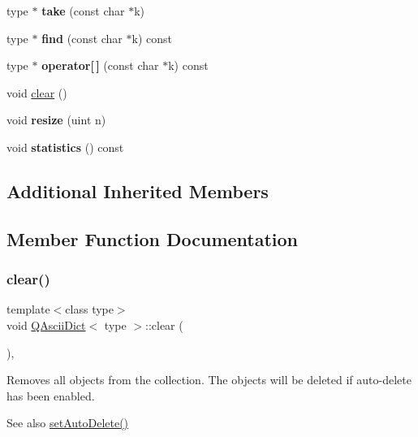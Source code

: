 \begin{DoxyCompactItemize}
type $\ast$ {\bfseries take} (const char $\ast$k)
\item 
\mbox{\label{class_q_ascii_dict_ab37ced8dc0e034d6a6797a054d433cb5}} 
type $\ast$ {\bfseries find} (const char $\ast$k) const
\item 
\mbox{\label{class_q_ascii_dict_a1fac101acb5ecb55be15d81f0b90ec6f}} 
type $\ast$ {\bfseries operator\mbox{[}$\,$\mbox{]}} (const char $\ast$k) const
\item 
void \mbox{\hyperlink{class_q_ascii_dict_a544cec757a84773073971b0a9d3e5e55}{clear}} ()
\item 
\mbox{\label{class_q_ascii_dict_aa783796d001af64fecedf110d8116d60}} 
void {\bfseries resize} (uint n)
\item 
\mbox{\label{class_q_ascii_dict_a2eb5f15ad2ff083ab7509887037d0675}} 
void {\bfseries statistics} () const
\end{DoxyCompactItemize}
\subsection*{Additional Inherited Members}


\subsection{Member Function Documentation}
\mbox{\label{class_q_ascii_dict_a544cec757a84773073971b0a9d3e5e55}} 
\subsubsection{\texorpdfstring{clear()}{clear()}}
{\footnotesize\ttfamily template$<$class type$>$ \\
void \mbox{\hyperlink{class_q_ascii_dict}{Q\+Ascii\+Dict}}$<$ type $>$\+::clear (\begin{DoxyParamCaption}{ }\end{DoxyParamCaption})\hspace{0.3cm}{\ttfamily [inline]}, {\ttfamily [virtual]}}

Removes all objects from the collection. The objects will be deleted if auto-\/delete has been enabled. \begin{DoxySeeAlso}{See also}
\mbox{\hyperlink{class_q_collection_a6ed41913c76bfba54be6da26015ee3f3}{set\+Auto\+Delete()}} 
\end{DoxySeeAlso}


